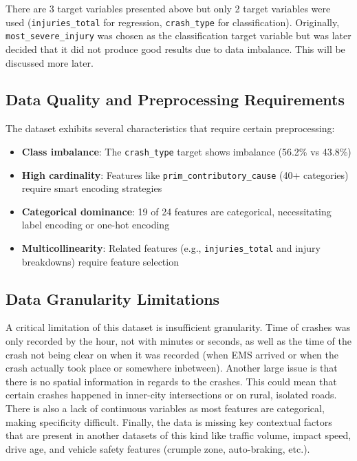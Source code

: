 \documentclass[stu,12pt,floatsintext]{apa7}
\begin{document}
There are 3 target variables presented above but only 2 target variables were used (\texttt{injuries\_total} for regression, \texttt{crash\_type} for classification). 
Originally, \texttt{most\_severe\_injury} was chosen as the classification target variable but was later decided that it did not produce good results due to data imbalance. 
This will be discussed more later.

\subsection{Data Quality and Preprocessing Requirements}

The dataset exhibits several characteristics that require certain preprocessing:

\begin{itemize}
    \item \textbf{Class imbalance}: The \texttt{crash\_type} target shows imbalance (56.2\% vs 43.8\%)
    \item \textbf{High cardinality}: Features like \texttt{prim\_contributory\_cause} (40+ categories) require smart encoding strategies
    \item \textbf{Categorical dominance}: 19 of 24 features are categorical, necessitating label encoding or one-hot encoding
    \item \textbf{Multicollinearity}: Related features (e.g., \texttt{injuries\_total} and injury breakdowns) require feature selection
\end{itemize}

\subsection{Data Granularity Limitations}

A critical limitation of this dataset is insufficient granularity. Time of crashes was only recorded by the hour, not with minutes or seconds, as well as the 
time of the crash not being clear on when it was recorded (when EMS arrived or when the crash actually took place or somewhere inbetween). Another large issue is that
there is no spatial information in regards to the crashes. This could mean that certain crashes happened in inner-city intersections or on rural, isolated roads. There is
also a lack of continuous variables as most features are categorical, making specificity difficult. Finally, the data is missing key contextual factors that are present 
in another datasets of this kind like traffic volume, impact speed, drive age, and vehicle safety features (crumple zone, auto-braking, etc.). 
\end{document}
